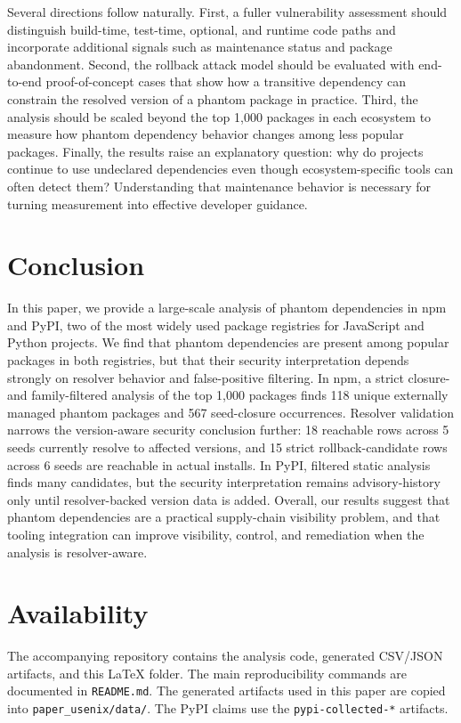 \documentclass[letterpaper,twocolumn,10pt]{article}
\newcommand{\npm}{npm\xspace}
\newcommand{\pypi}{PyPI\xspace}
\begin{document}
Several directions follow naturally.  First, a fuller vulnerability assessment
should distinguish build-time, test-time, optional, and runtime code paths and
incorporate additional signals such as maintenance status and package
abandonment.  Second, the rollback attack model should be evaluated with
end-to-end proof-of-concept cases that show how a transitive dependency can
constrain the resolved version of a phantom package in practice.  Third, the
analysis should be scaled beyond the top 1,000 packages in each ecosystem to
measure how phantom dependency behavior changes among less popular packages.
Finally, the results raise an explanatory question: why do projects continue to
use undeclared dependencies even though ecosystem-specific tools can often
detect them?  Understanding that maintenance behavior is necessary for turning
measurement into effective developer guidance.

\section{Conclusion}

In this paper, we provide a large-scale analysis of phantom dependencies in
\npm and \pypi, two of the most widely used package registries for JavaScript
and Python projects.  We find that phantom dependencies are present among
popular packages in both registries, but that their security interpretation
depends strongly on resolver behavior and false-positive filtering.  In \npm, a
strict closure- and family-filtered analysis of the top 1,000 packages finds
118 unique externally managed phantom packages and 567 seed-closure
occurrences.  Resolver validation narrows the version-aware security conclusion
further: 18 reachable rows across 5 seeds currently resolve to affected
versions, and 15 strict rollback-candidate rows across 6 seeds are reachable in
actual installs.  In \pypi, filtered static analysis finds many candidates, but
the security interpretation remains advisory-history only until resolver-backed
version data is added.  Overall, our results suggest that phantom dependencies
are a practical supply-chain visibility problem, and that tooling integration
can improve visibility, control, and remediation when the analysis is
resolver-aware.

\section*{Availability}

The accompanying repository contains the analysis code, generated CSV/JSON
artifacts, and this LaTeX folder.  The main reproducibility commands are
documented in \texttt{README.md}.  The generated artifacts used in this paper
are copied into \texttt{paper\_usenix/data/}.  The \pypi claims use the
\texttt{pypi-collected-*} artifacts.



\end{document}
